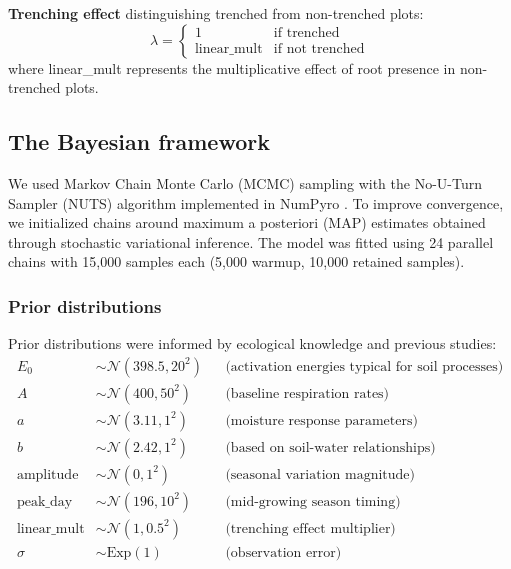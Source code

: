 \documentclass[12pt,a4paper]{article}
\begin{document}
\textbf{Trenching effect} distinguishing trenched from non-trenched plots:
\begin{equation}
\lambda = \begin{cases}
1 & \text{if trenched} \\
\text{linear\_mult} & \text{if not trenched}
\end{cases}
\end{equation}
where linear\_mult represents the multiplicative effect of root presence in non-trenched plots.

\subsection{The Bayesian framework}
We used Markov Chain Monte Carlo (MCMC) sampling with the No-U-Turn Sampler (NUTS) algorithm implemented in NumPyro \citep{phan2019composable}. To improve convergence, we initialized chains around maximum a posteriori (MAP) estimates obtained through stochastic variational inference. The model was fitted using 24 parallel chains with 15,000 samples each (5,000 warmup, 10,000 retained samples).

\subsubsection{Prior distributions}
Prior distributions were informed by ecological knowledge and previous studies:
\begin{align}
E_0 &\sim \mathcal{N}(398.5, 20^2) && \text{(activation energies typical for soil processes)} \\
A &\sim \mathcal{N}(400, 50^2) && \text{(baseline respiration rates)} \\
a &\sim \mathcal{N}(3.11, 1^2) && \text{(moisture response parameters)} \\
b &\sim \mathcal{N}(2.42, 1^2) && \text{(based on soil-water relationships)} \\
\text{amplitude} &\sim \mathcal{N}(0, 1^2) && \text{(seasonal variation magnitude)} \\
\text{peak\_day} &\sim \mathcal{N}(196, 10^2) && \text{(mid-growing season timing)} \\
\text{linear\_mult} &\sim \mathcal{N}(1, 0.5^2) && \text{(trenching effect multiplier)} \\
\sigma &\sim \text{Exp}(1) && \text{(observation error)}
\end{align}
\end{document}
